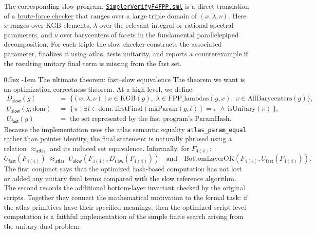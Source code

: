 \documentclass{easychair}
\makeatletter
\def\atlas{\textsf{atlas}\xspace}
\newcommand{\Ufast}{U_{\mathsf{fast}}}
\newcommand{\Uslow}{U_{\mathsf{slow}}}
\newcommand{\Dslow}{D_{\mathsf{slow}}}
\newcommand{\atlasEq}{\mathrel{\approx_{\atlas}}}
\newcommand{\KGB}{\mathrm{KGB}}
\renewcommand\paragraph{\@startsection{paragraph}{4}{\z@}%
  {0.9ex}   %
  {-1em}    %
  {\normalfont\normalsize\bfseries}}
\makeatother
\begin{document}
The corresponding slow program, \href{https://github.com/JUrban/atlasofliegroups_sml1/blob/to_ht_branch_alt/atlas-scripts-sml/SimplerVerifyF4FPP.sml}{\texttt{SimplerVerifyF4FPP.sml}} is a direct
translation of a \href{https://github.com/JUrban/atlasofliegroups_sml1/blob/to_ht_branch_alt/atlas-scripts/simpler_script_to_verify_F4_FPP_unitary_dual.at}{brute-force checker} that ranges over a large triple domain of
\((x,\lambda,\nu)\).  Here \(x\) ranges over KGB elements, \(\lambda\) over the
relevant integral or rational spectral parameters, and \(\nu\) over barycenters
of facets in the fundamental parallelepiped decomposition.  For each triple the
slow checker constructs the associated parameter, finalizes it using \atlas{},
tests unitarity, and reports a counterexample if the resulting unitary final
term is missing from the fast set.


\paragraph{The ultimate theorem: fast--slow equivalence}
The theorem we want is an optimization-correctness theorem.  At a high level,
we define:
\begin{align*}
\Dslow(g) &\;=\;\{(x,\lambda,\nu)\mid x\in \KGB(g),\;\lambda\in
\mathrm{FPP\_lambdas}(g,x),\;\nu\in \mathrm{AllBarycenters}(g)\},\\
\Uslow(g,\mathrm{dom}) &\;=\;\{\,\pi \mid \exists t\in \mathrm{dom}.\;
\mathrm{firstFinal}(\mathrm{mkParam}(g,t))=\pi\ \wedge\
\mathrm{isUnitary}(\pi)\,\},\\
\Ufast(g) &\;=\;\text{the set represented by the fast program's ParamHash}.
\end{align*}
Because the implementation uses the \atlas{} semantic equality
\texttt{atlas\_param\_equal} rather than pointer identity, the final statement
is naturally phrased using a relation \(\atlasEq\) and its induced set
equivalence.  Informally, for \(F_{4(4)}\):
\[
\Ufast(F_{4(4)})\;\atlasEq\;\Uslow(F_{4(4)},\Dslow(F_{4(4)}))
\quad\text{and}\quad
\mathrm{BottomLayerOK}(F_{4(4)},\Ufast(F_{4(4)})).
\]
The first conjunct says that the optimized hash-based computation has not lost
or added any unitary final terms compared with the slow reference algorithm.
The second records the additional bottom-layer invariant checked by the
original scripts.  Together they connect the mathematical motivation to the
formal task: if the \atlas{} primitives have their specified meanings, then the
optimized script-level computation is a faithful implementation of the simple
finite search arising from the unitary dual problem.
\end{document}
